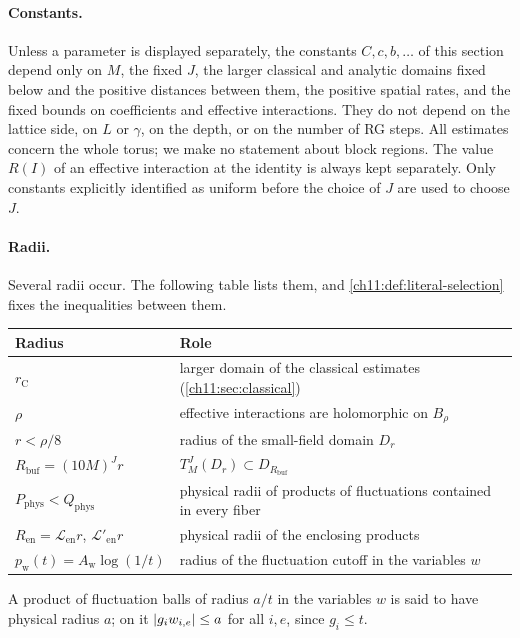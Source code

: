 \paragraph{Constants.}
Unless a parameter is displayed separately, the constants $C,c,b,\dots$ of this section depend only on $M$, the fixed $J$, the larger classical and analytic domains fixed below and the positive distances between them, the positive spatial rates, and the fixed bounds on coefficients and effective interactions. They do not depend on the lattice side, on $L$ or $\gamma$, on the depth, or on the number of RG steps. All estimates concern the whole torus; we make no statement about block regions. The value $R(I)$ of an effective interaction at the identity is always kept separately. Only constants explicitly identified as uniform before the choice of $J$ are used to choose $J$.

\paragraph{Radii.}
Several radii occur. The following table lists them, and \cref{ch11:def:literal-selection} fixes the inequalities between them.
\begin{center}
\begin{tabular}{lp{}}
\toprule
Radius & Role \\
\midrule
$r_{\mathrm C}$ & larger domain of the classical estimates (\cref{ch11:sec:classical}) \\
$\rho$ & effective interactions are holomorphic on $B_\rho$ \\
$r<\rho/8$ & radius of the small-field domain $D_r$ \\
$R_{\mathrm{buf}}=(10M)^Jr$ & $T_M^J(D_r)\subset D_{R_{\mathrm{buf}}}$ \\
$P_{\mathrm{phys}}<Q_{\mathrm{phys}}$ & physical radii of products of fluctuations contained in every fiber \\
$R_{\mathrm{en}}=\mathscr L_{\mathrm{en}}r$, $\mathscr L'_{\mathrm{en}}r$ & physical radii of the enclosing products \\
$p_{\mathrm w}(t)=A_{\mathrm w}\log(1/t)$ & radius of the fluctuation cutoff in the variables $w$ \\
\bottomrule
\end{tabular}
\end{center}
A product of fluctuation balls of radius $a/t$ in the variables $w$ is said to have physical radius $a$; on it $\lvert g_iw_{i,e}\rvert\le a$ for all $i,e$, since $g_i\le t$.

